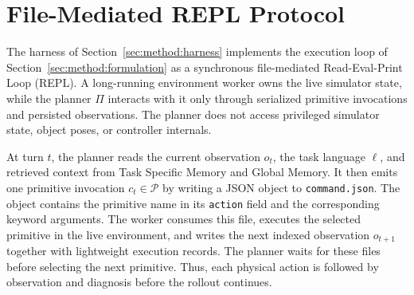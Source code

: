 \documentclass[11pt]{article}
\begin{document}
\clearpage




\appendix
\newpage

\section{File-Mediated REPL Protocol}
  \label{app:harness}

  The harness of Section~\ref{sec:method:harness} implements the execution loop of
  Section~\ref{sec:method:formulation} as a synchronous file-mediated
  Read-Eval-Print Loop (REPL). A long-running environment worker owns the live simulator
  state, while the planner $\Pi$ interacts with it only through serialized primitive
  invocations and persisted observations. The planner does not access privileged
  simulator state, object poses, or controller internals.

  At turn $t$, the planner reads the current observation $o_t$, the task language
  $\ell$, and retrieved context from Task Specific Memory and Global Memory. It then
  emits one primitive invocation $c_t \in \mathcal{P}$ by writing a JSON object to
  \texttt{command.json}. The object contains the primitive name in its \texttt{action}
  field and the corresponding keyword arguments. The worker consumes this file, executes
  the selected primitive in the live environment, and writes the next indexed observation
  $o_{t+1}$ together with lightweight execution records. The planner waits for these
  files before selecting the next primitive. Thus, each physical action is followed by
  observation and diagnosis before the rollout continues.
\end{document}
